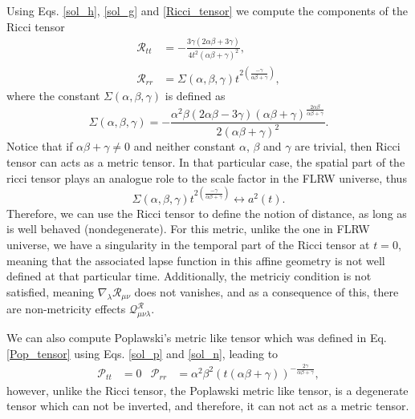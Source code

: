 Using Eqs. \eqref{sol_h}, \eqref{sol_g} and \eqref{Ricci_tensor} we compute the components 
of the Ricci tensor
\begin{align}
    \mathcal{R}_{tt} & = -\frac{3\gamma\left(2\alpha\beta + 3\gamma\right)}{4t^2\left(\alpha\beta + \gamma\right)^2}, \label{R_temporal} \\
    \mathcal{R}_{rr} & = \Sigma\left(\alpha,\beta,\gamma\right)t^{2\left(\frac{-\gamma}{\alpha\beta + \gamma}\right)} \label{R_spatial},
\end{align}
where the constant $\Sigma\left(\alpha,\beta,\gamma\right)$ is defined as
\begin{equation}
    \Sigma\left(\alpha,\beta,\gamma\right) = -\frac{\alpha^2\beta\left(2\alpha\beta - 3\gamma\right)\left(\alpha\beta + \gamma\right)^{\frac{2\alpha\beta}{\alpha\beta + \gamma}}}{2\left(\alpha\beta +\gamma\right)^2}.
\end{equation}
Notice that if $\alpha\beta + \gamma \neq 0$ and neither constant $\alpha$, $\beta$
and $\gamma$ are trivial, then Ricci tensor can acts as a metric tensor. In that 
particular case, the spatial part of the ricci tensor plays an analogue role to 
the scale factor in the FLRW universe, thus
\begin{equation}
    \Sigma\left(\alpha,\beta,\gamma\right)t^{2\left(\frac{-\gamma}{\alpha\beta + \gamma}\right)} \longleftrightarrow a^2(t).
\end{equation}
Therefore, we can use the Ricci tensor to define the notion of distance, as 
long as is well behaved (nondegenerate). For this metric, unlike the one in FLRW 
universe, we have a singularity in the temporal part of the Ricci tensor at $t = 0$, 
meaning that the associated lapse function in this affine geometry is not well 
defined at that particular time. Additionally, the metriciy condition is not satisfied, 
meaning $\nabla_\lambda \mathcal{R}_{\mu\nu}$ does  not vanishes, and as a consequence 
of this, there are non-metricity effects $\mathcal{Q}^{\mathcal{R}}_{\mu\nu\lambda}$.

We can also compute Poplawski's metric like tensor which 
was defined in Eq. \eqref{Pop_tensor} using Eqs. \eqref{sol_p} and \eqref{sol_n}, leading to
\begin{align}
    \mathcal{P}_{tt} & = 0 & \mathcal{P}_{rr} & = \alpha^2\beta^2\left(t\left(\alpha\beta + \gamma\right)\right)^{-\frac{2\gamma}{\alpha\beta + \gamma}},
\end{align}
however, unlike the Ricci tensor, the Poplawski metric like tensor, is a 
degenerate tensor which can not be inverted, and therefore, it can not
act as a metric tensor.

